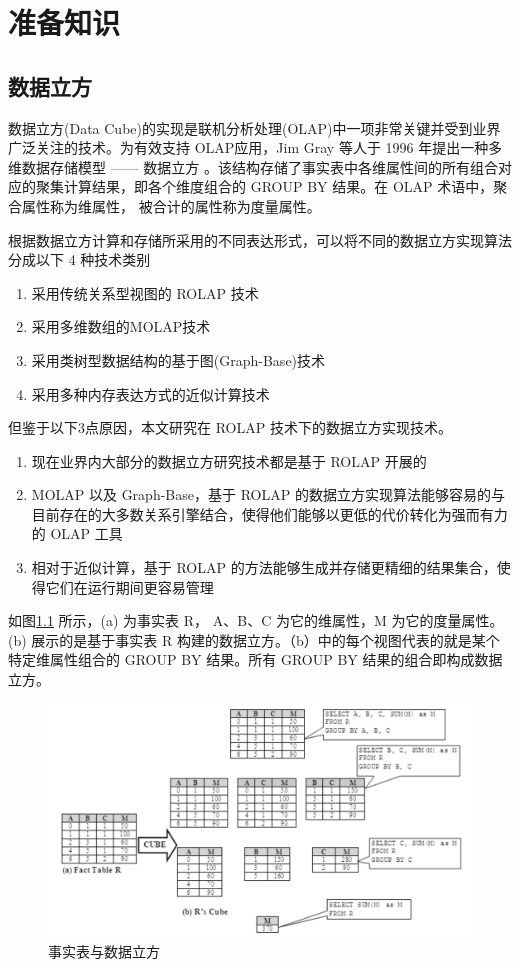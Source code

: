 \chapter{准备知识}

\section{数据立方}
数据立方(Data Cube)的实现是联机分析处理(OLAP)中一项非常关键并受到业界广泛关注的技术。为有效支持 OLAP应用，Jim Gray 等人于 1996 年提出一种多维数据存储模型 —— 数据立方 \cite{gray1997data}。该结构存储了事实表中各维属性间的所有组合对应的聚集计算结果，即各个维度组合的 GROUP BY 结果。在 OLAP 术语中，聚合属性称为维属性， 被合计的属性称为度量属性。

根据数据立方计算和存储所采用的不同表达形式，可以将不同的数据立方实现算法分成以下 4 种技术类别
\begin{enumerate}
\item 采用传统关系型视图的 ROLAP 技术 \cite{morfonios2007rolap}
\item 采用多维数组的MOLAP技术 \cite{zhao1997array}
\item 采用类树型数据结构的基于图(Graph-Base)技术 \cite{zhao2011graph}
\item 采用多种内存表达方式的近似计算技术 \cite{kamatdistributed}
\end{enumerate}

但鉴于以下3点原因，本文研究在 ROLAP 技术下的数据立方实现技术。
\begin{enumerate}
\item 现在业界内大部分的数据立方研究技术都是基于 ROLAP 开展的
\item MOLAP 以及 Graph-Base，基于 ROLAP 的数据立方实现算法能够容易的与目前存在的大多数关系引擎结合，使得他们能够以更低的代价转化为强而有力的 OLAP 工具
\item 相对于近似计算，基于 ROLAP 的方法能够生成并存储更精细的结果集合，使得它们在运行期间更容易管理
\end{enumerate}

如图\ref{fact_table_data_cube} 所示，(a) 为事实表 R， A、B、C 为它的维属性，M 为它的度量属性。(b) 展示的是基于事实表 R 构建的数据立方。（b）中的每个视图代表的就是某个特定维属性组合的 GROUP BY 结果。所有 GROUP BY 结果的组合即构成数据立方。

\begin{figure}[hbtp]
\centering\includegraphics[width=6in]{picture/ch_preliminary/fact_table_data_cube} 
\caption{事实表与数据立方}\label{fact_table_data_cube} 
\end{figure} 

